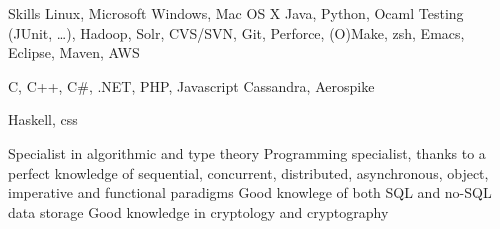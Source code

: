 \begin{rubric}{\color{ForestGreen} Skills}
  \entry*[Expert]
  Linux, Microsoft Windows, Mac OS X
  \entry*
  Java, Python, Ocaml
  \entry* Testing (JUnit, \ldots), Hadoop, Solr, \LaTeXe
  \entry*
  CVS/SVN, Git, Perforce, (O)Make, zsh, Emacs, Eclipse, Maven, AWS

  \entry*[Mastered]
  C, C++, C$\#$, .NET, PHP, Javascript
  \entry* Cassandra, Aerospike

  \entry*[Notions]
  Haskell, css


  \entry*
  Specialist in algorithmic and type theory
  \entry*
  Programming specialist, thanks to a perfect knowledge of sequential,
  concurrent, distributed, asynchronous, object, imperative
  and functional paradigms
  \entry* Good knowlege of both SQL and no-SQL data storage
  \entry*
  Good knowledge in cryptology and cryptography

\end{rubric}
